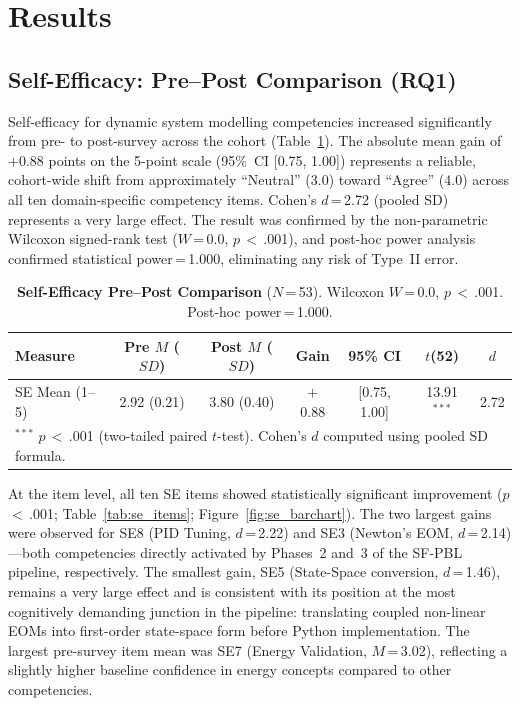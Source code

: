 \documentclass[utf8]{FrontiersinHarvard}
\begin{document}
\section{Results}

\subsection{Self-Efficacy: Pre--Post Comparison (RQ1)}

Self-efficacy for dynamic system modelling competencies increased
significantly from pre- to post-survey across the cohort
(Table~\ref{tab:se_main}). The absolute mean gain of $+$0.88 points on
the 5-point scale (95\%~CI [0.75, 1.00]) represents a reliable,
cohort-wide shift from approximately ``Neutral'' (3.0) toward ``Agree''
(4.0) across all ten domain-specific competency items. Cohen's $d$\,=\,2.72
(pooled SD) represents a very large effect. The result was confirmed by the
non-parametric Wilcoxon signed-rank test ($W$\,=\,0.0, $p$\,$<$\,.001),
and post-hoc power analysis confirmed statistical power\,=\,1.000,
eliminating any risk of Type~II error.

\begin{table}[h]
\caption{\textbf{Self-Efficacy Pre--Post Comparison} ($N$\,=\,53).
Wilcoxon $W$\,=\,0.0, $p$\,$<$\,.001. Post-hoc power\,=\,1.000.}
\label{tab:se_main}
\begin{tabular}{lcccccc}
\toprule
\textbf{Measure} & \textbf{Pre} $M$ ($SD$) & \textbf{Post} $M$ ($SD$) &
\textbf{Gain} & \textbf{95\% CI} & $t$(52) & $d$ \\
\midrule
SE Mean (1--5) & 2.92 (0.21) & 3.80 (0.40) & $+$0.88 &
[0.75, 1.00] & 13.91$^{***}$ & 2.72 \\
\bottomrule
\multicolumn{7}{l}{\small $^{***}$ $p$\,$<$\,.001 (two-tailed paired $t$-test).
Cohen's $d$ computed using pooled SD formula.} \\
\end{tabular}
\end{table}

At the item level, all ten SE items showed statistically significant
improvement ($p$\,$<$\,.001; Table~\ref{tab:se_items};
Figure~\ref{fig:se_barchart}). The two largest gains were observed for
SE8 (PID Tuning, $d$\,=\,2.22) and SE3 (Newton's EOM, $d$\,=\,2.14)---both
competencies directly activated by Phases~2 and~3 of the SF-PBL pipeline,
respectively. The smallest gain, SE5 (State-Space conversion, $d$\,=\,1.46),
remains a very large effect and is consistent with its position at the most
cognitively demanding junction in the pipeline: translating coupled
non-linear EOMs into first-order state-space form before Python
implementation. The largest pre-survey item mean was SE7 (Energy Validation,
$M$\,=\,3.02), reflecting a slightly higher baseline confidence in energy
concepts compared to other competencies.
\end{document}

